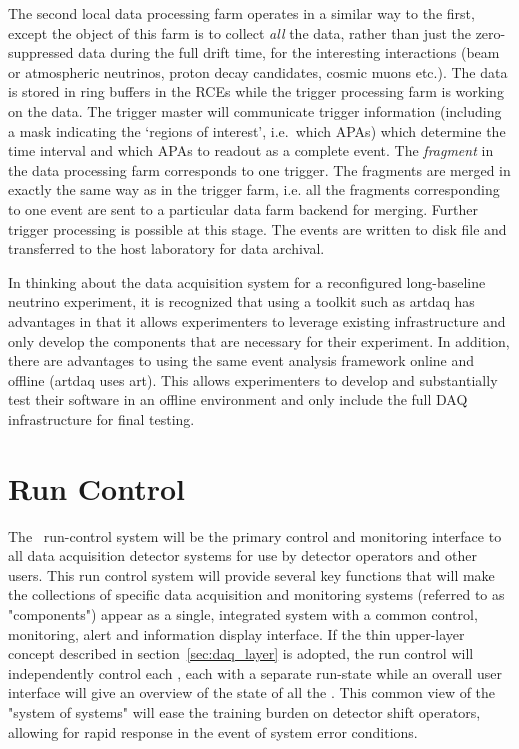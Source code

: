 The second local data processing farm operates in a similar way to the
first, except the object of this farm is to collect {\it all} the
data, rather than just the zero-suppressed data during the full drift
time, for the interesting interactions (beam or atmospheric neutrinos,
proton decay candidates, cosmic muons etc.).  The data is stored in
ring buffers in the RCEs while the trigger processing farm is working
on the data.  The trigger master will communicate trigger information
(including a mask indicating the `regions of interest', i.e.\ which
APAs) which determine the time interval and which APAs to readout as a
complete event.  The {\it fragment} in the data processing farm
corresponds to one trigger.  The fragments are merged in exactly the
same way as in the trigger farm, i.e. all the fragments corresponding
to one event are sent to a particular data farm backend for merging.
Further trigger processing is possible at this stage.  The events are
written to disk file and transferred to the host laboratory for data
archival.

In thinking about the data acquisition system for a reconfigured
long-baseline neutrino experiment, it is recognized that using a
toolkit such as artdaq has advantages in that it allows experimenters
to leverage existing infrastructure and only develop the components
that are necessary for their experiment.  In addition, there are
advantages to using the same event analysis framework online and
offline (artdaq uses art).  This allows experimenters to develop and
substantially test their software in an offline environment and only
include the full DAQ infrastructure for final testing.

\section{Run Control }
\label{sec:daq_runcontrol}

The \LBNE\ run-control system will be the primary control and
monitoring interface to all data acquisition detector systems for use
by detector operators and other users.  This run control system will
provide several key functions that will make the collections of
specific data acquisition and monitoring systems (referred to as
"components") appear as a single, integrated system with a common
control, monitoring, alert and information display interface.  If the
thin upper-layer concept described in section~\ref{sec:daq_layer} is
adopted, the run control will independently control each \COMPARTMENT,
each with a separate run-state while an overall user interface will
give an overview of the state of all the \COMPARTMENTS.  This common
view of the "system of systems" will ease the training burden on
detector shift operators, allowing for rapid response in the event of
system error conditions.

